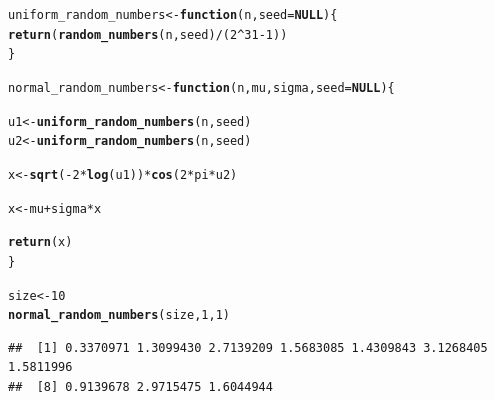 \documentclass[11pt, a4paper]{article}\usepackage[]{graphicx}\usepackage[]{xcolor}
\makeatletter
\newcommand{\hlnum}[1]{\textcolor[rgb]{0.686,0.059,0.569}{#1}}%
\newcommand{\hlopt}[1]{\textcolor[rgb]{0,0,0}{#1}}%
\newcommand{\hldef}[1]{\textcolor[rgb]{0.345,0.345,0.345}{#1}}%
\newcommand{\hlkwa}[1]{\textcolor[rgb]{0.161,0.373,0.58}{\textbf{#1}}}%
\newcommand{\hlkwb}[1]{\textcolor[rgb]{0.69,0.353,0.396}{#1}}%
\newcommand{\hlkwc}[1]{\textcolor[rgb]{0.333,0.667,0.333}{#1}}%
\newcommand{\hlkwd}[1]{\textcolor[rgb]{0.737,0.353,0.396}{\textbf{#1}}}%
\newenvironment{kframe}{%
 \def\at@end@of@kframe{}%
 \ifinner\ifhmode%
  \def\at@end@of@kframe{\end{minipage}}%
  \begin{minipage}{\columnwidth}%
 \fi\fi%
 \def\FrameCommand##1{\hskip\@totalleftmargin \hskip-\fboxsep
 \colorbox{shadecolor}{##1}\hskip-\fboxsep
     \hskip-\linewidth \hskip-\@totalleftmargin \hskip\columnwidth}%
 \MakeFramed {\advance\hsize-\width
   \@totalleftmargin\z@ \linewidth\hsize
   \@setminipage}}%
 {\par\unskip\endMakeFramed%
 \at@end@of@kframe}
\newenvironment{knitrout}{}{} %
\makeatother
\begin{document}
\begin{knitrout}
\color{fgcolor}\begin{kframe}
\begin{alltt}
\hldef{uniform_random_numbers} \hlkwb{<-} \hlkwa{function}\hldef{(}\hlkwc{n}\hldef{,} \hlkwc{seed} \hldef{=} \hlkwa{NULL}\hldef{)\{}
  \hlkwd{return}\hldef{(}\hlkwd{random_numbers}\hldef{(n, seed)} \hlopt{/} \hldef{(}\hlnum{2}\hlopt{^}\hlnum{31} \hlopt{-} \hlnum{1}\hldef{))}
\hldef{\}}
\end{alltt}
\end{kframe}
\end{knitrout}

\begin{knitrout}
\color{fgcolor}\begin{kframe}
\begin{alltt}
\hldef{normal_random_numbers} \hlkwb{<-} \hlkwa{function}\hldef{(}\hlkwc{n}\hldef{,} \hlkwc{mu}\hldef{,} \hlkwc{sigma}\hldef{,} \hlkwc{seed} \hldef{=} \hlkwa{NULL}\hldef{)\{}

  \hldef{u1} \hlkwb{<-} \hlkwd{uniform_random_numbers}\hldef{(n, seed)}
  \hldef{u2} \hlkwb{<-} \hlkwd{uniform_random_numbers}\hldef{(n, seed)}

  \hldef{x} \hlkwb{<-} \hlkwd{sqrt}\hldef{(}\hlopt{-}\hlnum{2} \hlopt{*} \hlkwd{log}\hldef{(u1))} \hlopt{*} \hlkwd{cos}\hldef{(}\hlnum{2} \hlopt{*} \hldef{pi} \hlopt{*} \hldef{u2)}

  \hldef{x} \hlkwb{<-} \hldef{mu} \hlopt{+} \hldef{sigma} \hlopt{*} \hldef{x}

  \hlkwd{return}\hldef{(x)}
\hldef{\}}
\end{alltt}
\end{kframe}
\end{knitrout}

\begin{knitrout}
\color{fgcolor}\begin{kframe}
\begin{alltt}
\hldef{size} \hlkwb{<-} \hlnum{10}
\hlkwd{normal_random_numbers}\hldef{(size,} \hlnum{1}\hldef{,} \hlnum{1}\hldef{)}
\end{alltt}
\begin{verbatim}
##  [1] 0.3370971 1.3099430 2.7139209 1.5683085 1.4309843 3.1268405 1.5811996
##  [8] 0.9139678 2.9715475 1.6044944
\end{verbatim}
\end{kframe}
\end{knitrout}
\end{document}
